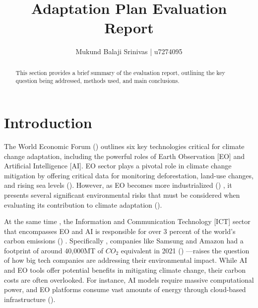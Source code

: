 \documentclass[12pt]{article}
\title{Adaptation Plan Evaluation Report}
\author{Mukund Balaji Srinivas | u7274095}
\date{} %
\begin{document}
\maketitle

\begin{abstract}
This section provides a brief summary of the evaluation report, outlining the key question being addressed, methods used, and main conclusions.
\end{abstract}

\newpage

\section*{Introduction}

The World Economic Forum (\cite{masterson_2024})  outlines six key technologies critical for climate change adaptation, 
including the powerful roles of Earth Observation [EO] and Artificial Intelligence [AI]. 
EO sector plays a pivotal role in climate change mitigation by offering critical data for monitoring deforestation, land-use changes, and rising sea levels (\cite{anderson_2017}). 
However, as EO becomes more industrialized (\cite{venkatesan_2020}) , it presents several significant environmental risks that must be considered when evaluating its contribution to climate adaptation (\cite{crisp_2020}).

At the same time , the  Information and Communication Technology [ICT] sector that encompasses EO and AI
is responsible for over 3 percent of the world's carbon emissions (\cite{jones_2018}) . Specifically , 
companies like Samsung and Amazon had a footprint of around 40,000MT of \(CO_2\) equivalent in 2021 (\cite{navarro_2023_the}) —raises the question 
of how big tech companies are addressing their environmental impact. While AI and EO tools offer potential benefits in 
mitigating climate change, their carbon costs are often overlooked. For instance, AI models require massive computational power, 
and EO platforms consume vast amounts of energy through cloud-based infrastructure (\cite{taddeo_2021}).
\end{document}
